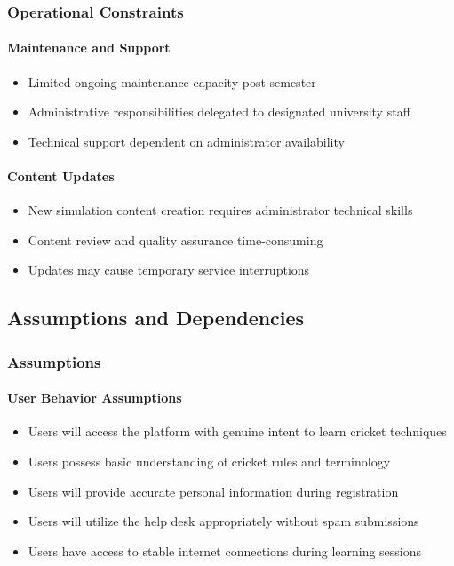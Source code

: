 \documentclass[12pt,a4paper]{article}
\begin{document}
\begin{enumerate}
\subsubsection{Operational Constraints}
\paragraph{Maintenance and Support}
\begin{itemize}
    \item Limited ongoing maintenance capacity post-semester
    \item Administrative responsibilities delegated to designated university staff
    \item Technical support dependent on administrator availability
\end{itemize}

\paragraph{Content Updates}
\begin{itemize}
    \item New simulation content creation requires administrator technical skills
    \item Content review and quality assurance time-consuming
    \item Updates may cause temporary service interruptions
\end{itemize}

\subsection{Assumptions and Dependencies}

\subsubsection{Assumptions}
\paragraph{User Behavior Assumptions}
\begin{itemize}
    \item Users will access the platform with genuine intent to learn cricket techniques
    \item Users possess basic understanding of cricket rules and terminology
    \item Users will provide accurate personal information during registration
    \item Users will utilize the help desk appropriately without spam submissions
    \item Users have access to stable internet connections during learning sessions
\end{itemize}


\end{enumerate}
\end{document}
